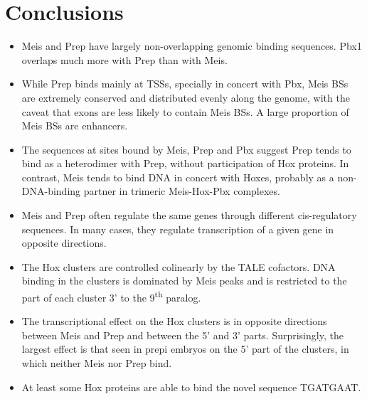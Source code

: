 \chapter{Conclusions}
\label{chp:conclusions}

\begin{itemize}

  \item Meis and Prep have largely non-overlapping genomic binding sequences. Pbx1 overlaps much more with Prep than with Meis. 
  
  \item While Prep binds mainly at \acp{TSS}, specially in concert with Pbx, Meis \acp{BS} are extremely conserved and distributed evenly along the genome, with the caveat that exons are less likely to contain Meis \acp{BS}. A large proportion of Meis \acp{BS} are enhancers. 
  
  \item The sequences at sites bound by Meis, Prep and Pbx suggest Prep tends to bind as a heterodimer with Prep, without participation of Hox proteins. In contrast, Meis tends to bind DNA in concert with Hoxes, probably as a non-DNA-binding partner in trimeric Meis-Hox-Pbx complexes.
    
  \item Meis and Prep often regulate the same genes through different cis-regulatory sequences. In many cases, they regulate transcription of a given gene in opposite directions.  
  
  \item The Hox clusters are controlled colinearly by the \ac{TALE} cofactors. DNA binding in the clusters is dominated by Meis peaks and is restricted to the part of each cluster 3' to the 9\textsuperscript{th} paralog.
  
  \item The transcriptional effect on the Hox clusters is in opposite directions between Meis and Prep and between the 5' and 3' parts. Surprisingly, the largest effect is that seen in \ac{prepi} embryos on the 5' part of the clusters, in which neither Meis nor Prep bind.
   
  \item At least some Hox proteins are able to bind the novel sequence TGATGAAT.

\end{itemize}